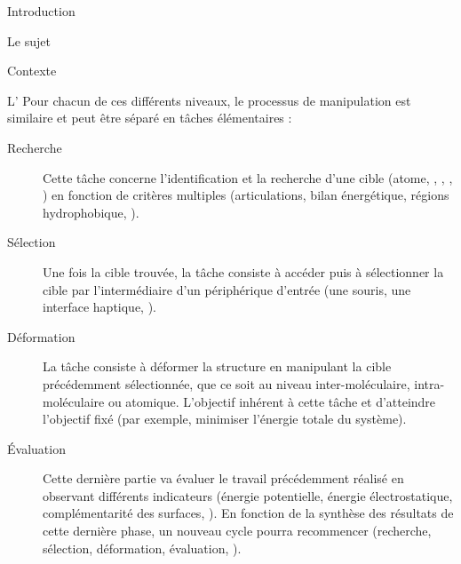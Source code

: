 \documentclass[myfrancais]{mythesis}
\begin{document}
\begin{mypart}{Introduction}
\begin{mychapter}{Le sujet}
\begin{mysection}{Contexte}
\begin{mysubsection}{L'}
					Pour chacun de ces différents niveaux, le processus de manipulation est similaire et peut être séparé en tâches élémentaires  :
					\begin{description}
						\item[Recherche] Cette tâche concerne l'identification et la recherche d'une cible (atome, , \myhelice*, \myfeuillet*, \myetc) en fonction de critères multiples (articulations, bilan énergétique, régions hydrophobique, \myetc).
						\item[Sélection] Une fois la cible trouvée, la tâche consiste à accéder puis à sélectionner la cible par l'intermédiaire d'un périphérique d'entrée (une souris, une interface haptique, \myetc).
						\item[Déformation] La tâche consiste à déformer la structure en manipulant la cible précédemment sélectionnée, que ce soit au niveau inter-moléculaire, intra-moléculaire ou atomique.
							L'objectif inhérent à cette tâche et d'atteindre l'objectif fixé (par exemple, minimiser l'énergie totale du système).
						\item[Évaluation] Cette dernière partie va évaluer le travail précédemment réalisé en observant différents indicateurs (énergie potentielle, énergie électrostatique, complémentarité des surfaces, \myetc).
							En fonction de la synthèse des résultats de cette dernière phase, un nouveau cycle pourra recommencer (recherche, sélection, déformation, évaluation, \myetc).
					\end{description}


\end{mysubsection}
\end{mysection}
\end{mychapter}
\end{mypart}
\end{document}
